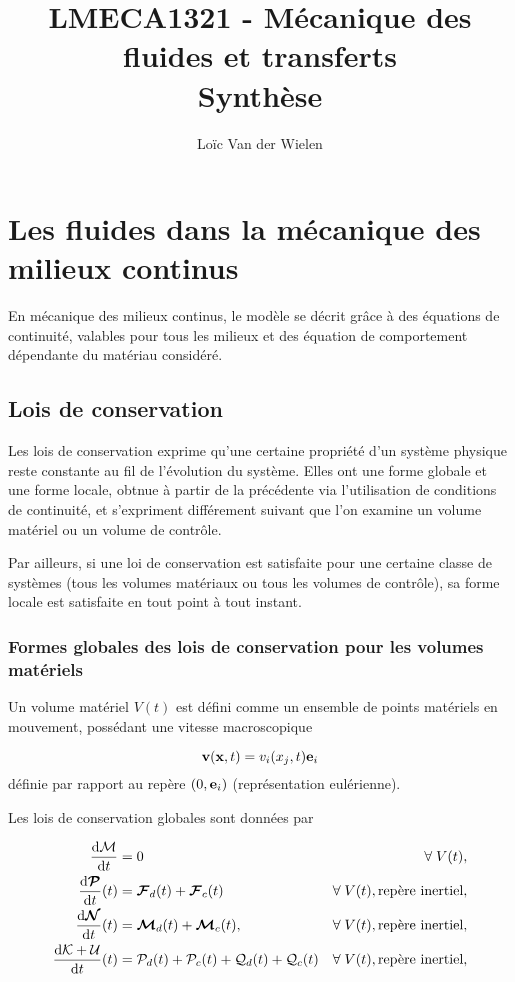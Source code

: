 \documentclass[a4paper,11pt]{report}
\title{LMECA1321 - Mécanique des fluides et transferts\\Synthèse}
\author{Loïc Van der Wielen}
\newcommand{\bs}[1]{\boldsymbol{#1}}
\begin{document}
\maketitle
\tableofcontents



\chapter{Les fluides dans la mécanique des milieux continus}
  En mécanique des milieux continus, le modèle se décrit grâce à des équations de continuité, valables pour tous les milieux et des équation de comportement dépendante du matériau considéré.

  \section{Lois de conservation}
    Les lois de conservation exprime qu'une certaine propriété d'un système physique reste constante au fil de l'évolution du système. Elles ont une forme globale et une forme locale, obtnue à partir de la précédente via l'utilisation de conditions de continuité, et s'expriment différement suivant que l'on examine un volume matériel ou un volume de contrôle.

    Par ailleurs, si une loi de conservation est satisfaite pour une certaine classe de systèmes (tous les volumes matériaux ou tous les volumes de contrôle), sa forme locale est satisfaite en tout point à tout instant.

    \subsection{Formes globales des lois de conservation pour les volumes matériels}
      Un volume matériel $V(t)$ est défini comme un ensemble de points matériels en mouvement, possédant une vitesse macroscopique

      \begin{equation}
        \vb{v}(\vb{x}, t) = v_i(x_j, t)\vb{e}_i
      \end{equation}
      définie par rapport au repère $(0, \vb{e}_i)$ (représentation eulérienne).

      Les lois de conservation globales sont données par

      \begin{equation}\begin{aligned}
        \dv{\mathcal{M}}{t} &= 0 & \forall \; V(t),\\
        \dv{\bs{\mathcal{P}}}{t} {}(t) &= \bs{\mathcal{F}}_d(t) + \bs{\mathcal{F}}_c(t) & \forall \; V(t), \textrm{repère inertiel},\\
        \dv{\bs{\mathcal{N}}}{t} {}(t) &= \bs{\mathcal{M}}_d(t) + \bs{\mathcal{M}}_c(t), & \forall \; V(t), \textrm{repère inertiel}, \\
        \dv{\mathcal{K} + \mathcal{U}}{t} {}(t) &= \mathcal{P}_d(t) + \mathcal{P}_c(t) + \mathcal{Q}_d(t) + \mathcal{Q}_c(t) & \forall \; V(t), \textrm{repère inertiel},
      \end{aligned}\end{equation}
\end{document}
